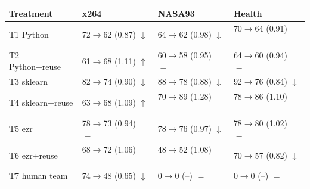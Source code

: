 \begin{tabular}{llll}
\toprule
Treatment & x264 & NASA93 & Health \\
\midrule
T1 Python & 72$\to$62 (0.87) $\downarrow$ & 64$\to$62 (0.98) $\downarrow$ & 70$\to$64 (0.91) $=$ \\
T2 Python+reuse & 61$\to$68 (1.11) $\uparrow$ & 60$\to$58 (0.95) $=$ & 64$\to$60 (0.94) $=$ \\
T3 sklearn & 82$\to$74 (0.90) $\downarrow$ & 88$\to$78 (0.88) $\downarrow$ & 92$\to$76 (0.84) $\downarrow$ \\
T4 sklearn+reuse & 63$\to$68 (1.09) $\uparrow$ & 70$\to$89 (1.28) $=$ & 78$\to$86 (1.10) $=$ \\
T5 ezr & 78$\to$73 (0.94) $=$ & 78$\to$76 (0.97) $\downarrow$ & 78$\to$80 (1.02) $=$ \\
T6 ezr+reuse & 68$\to$72 (1.06) $=$ & 48$\to$52 (1.08) $=$ & 70$\to$57 (0.82) $\downarrow$ \\
T7 human team & 74$\to$48 (0.65) $\downarrow$ & 0$\to$0 (--) $=$ & 0$\to$0 (--) $=$ \\
\bottomrule
\end{tabular}